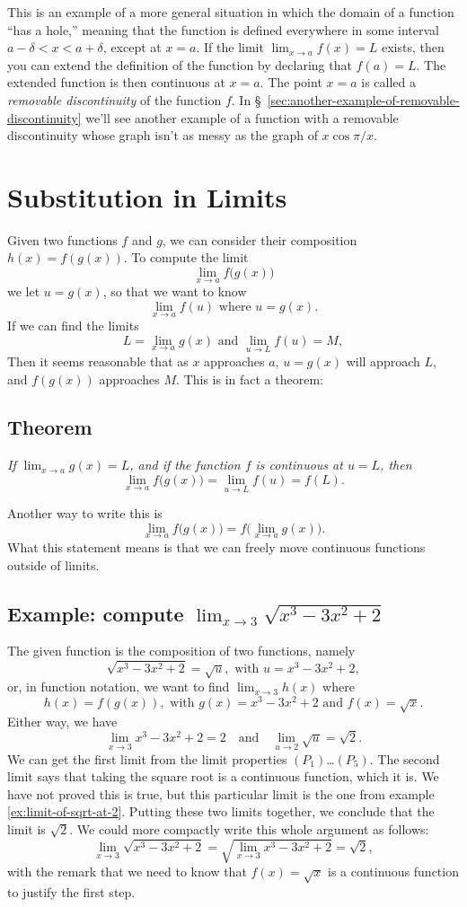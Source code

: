 This is an example of a more general situation in which the domain of
a function ``has a hole,'' meaning that the function is defined
everywhere in some interval $a-\delta <x < a+\delta$, except at $x=a$.
If the limit $\lim_{x\to a} f(x) = L$ exists, then you can extend the
definition of the function by declaring that $f(a) = L$.  The extended
function is then continuous at $x=a$.  The point $x=a$ is called a
\emph{removable discontinuity} of the function $f$.  In
\S~\ref{sec:another-example-of-removable-discontinuity} we'll see
another example of a function with a removable discontinuity whose
graph isn't as messy as the graph of $x\cos\pi/x$.


\section{Substitution in Limits} 
\label{sec:substitution-in-limits} Given
two functions $f$ and $g$, we can consider their composition $h(x) = f(g(x))$.
To compute the limit
\[
\lim_{x\to a} f\bigl(g(x)\bigr)
\]
we let $u=g(x)$, so that we want to know
\[
\lim_{x\to a}f(u) \text{ where }u=g(x).
\]
If we can find the limits
\[
L = \lim_{x\to a} g(x)\text{ and } \lim_{u\to L} f(u) = M,
\]
Then it seems reasonable that as $x$ approaches $a$, $u=g(x)$ will approach
$L$, and $f(g(x))$ approaches $M$.
This is in fact a theorem:
\subsection{Theorem} 
\label{thm:substitution}%
\itshape%
If $\lim_{x\to a}g(x) = L$, and if the function $f$ is continuous at $u=L$,
then
\[
\lim_{x\to a}f\bigl(g(x)\bigr) = \lim_{u\to L}f(u) = f(L).
\]\upshape

Another way to write this is
\[
\lim_{x\to a}f\bigl(g(x)\bigr) = f\bigl(\lim_{x\to a}g(x)\bigr).
\]
What this statement means is that we can freely move continuous functions outside of limits.
\subsection{Example: compute $\lim_{x\to3}\sqrt{x^3-3x^2+2}$} 
The given function is the composition of two functions, namely
\[
\sqrt{x^3-3x^2+2} = \sqrt u, \text{ with } u = x^3-3x^2+2,
\]
or, in function notation, we want to find $\lim_{x\to 3}h(x)$ where
\[
h(x) = f(g(x)), \text{ with } g(x) = x^3-3x^2+2\text{ and }f(x) = \sqrt{x}.
\]
Either way, we have
\[
\lim_{x\to 3}x^3-3x^2+2 = 2\quad\text{and}\quad \lim_{u\to 2}\sqrt u =
\sqrt 2.
\]
We can get the first limit from the limit properties $(P_1)$\ldots$(P_5)$.
The second limit says that taking the square root is a continuous function,
which it is. We have not proved this is true, but this particular limit is
the one from example \ref{ex:limit-of-sqrt-at-2}.  Putting these two limits
together, we conclude that the limit is $\sqrt2$.
We could more compactly write this whole argument as follows:
\[
\lim_{x\to3}\sqrt{x^3 - 3x^2 + 2} =\sqrt{\lim_{x\to 3}x^3 - 3x^2 + 2}
=\sqrt 2,
\]
with the remark that we need to know that $f(x)=\sqrt x$ is a continuous
function to justify the first step.

